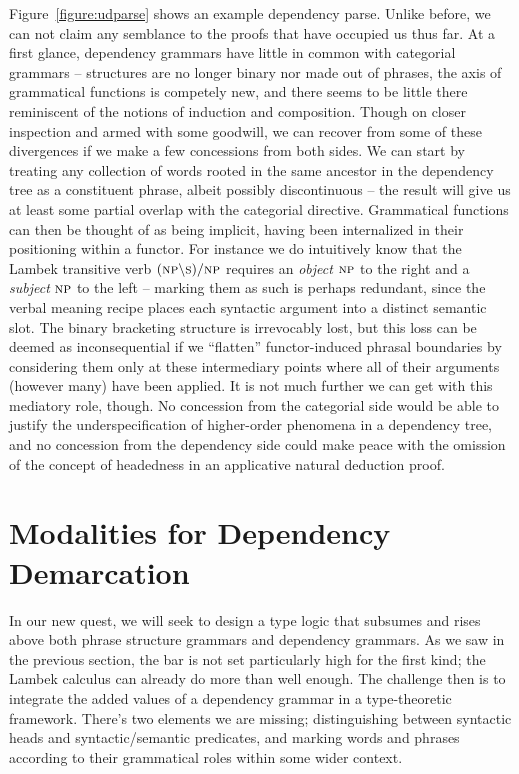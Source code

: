 Figure~\ref{figure:udparse} shows an example dependency parse.
Unlike before, we can not claim any semblance to the proofs that have occupied us thus far.
At a first glance, dependency grammars have little in common with categorial grammars -- structures are no longer binary nor made out of phrases, the axis of grammatical functions is competely new, and there seems to be little there reminiscent of the notions of induction and composition.
Though on closer inspection and armed with some goodwill, we can recover from some of these divergences if we make a few concessions from both sides.
We can start by treating any collection of words rooted in the same ancestor in the dependency tree as a constituent phrase, albeit possibly discontinuous -- the result will give us at least some partial overlap with the categorial directive.
Grammatical functions can then be thought of as being implicit, having been internalized in their positioning within a functor.
For instance we do intuitively know that the Lambek transitive verb $(\np[s]\divleft\s[s])\divright\np[s]$ requires an \textit{object} $\np[s]$ to the right and a \textit{subject} $\np[s]$ to the left -- marking them as such is perhaps redundant, since the verbal meaning recipe places each syntactic argument into a distinct semantic slot.
The binary bracketing structure is irrevocably lost, but this loss can be deemed as inconsequential if we ``flatten'' functor-induced phrasal boundaries by considering them only at these intermediary points where all of their arguments (however many) have been applied.
It is not much further we can get with this mediatory role, though.
No concession from the categorial side would be able to justify the underspecification of higher-order phenomena in a dependency tree,
and no concession from the dependency side could make peace with the omission of the concept of headedness in an applicative natural deduction proof.

\section{Modalities for Dependency Demarcation}
\label{section:modalities_for_dependency}
In our new quest, we will seek to design a type logic that subsumes and rises above both phrase structure grammars and dependency grammars.
As we saw in the previous section, the bar is not set particularly high for the first kind; the Lambek calculus can already do more than well enough.
The challenge then is to integrate the added values of a dependency grammar in a type-theoretic framework.
There's two elements we are missing; distinguishing between syntactic heads and syntactic/semantic predicates, and marking words and phrases according to their grammatical roles within some wider context.

